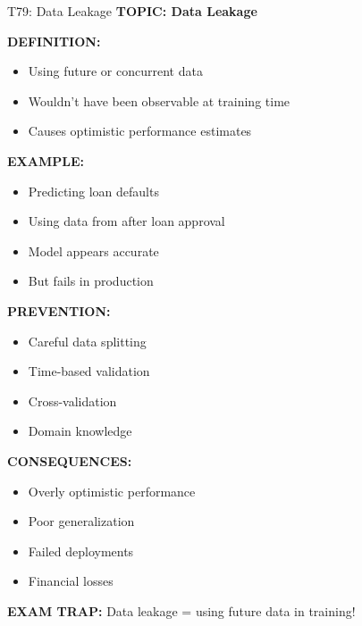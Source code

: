 \documentclass[8pt]{beamer}
\begin{document}
	\begin{frame}{T79: Data Leakage}
		\fontsize{6.5}{7.5}\selectfont
		\textbf{TOPIC: Data Leakage}
		
		\vspace{0.1cm}
		\textbf{DEFINITION:}
		\begin{itemize}
			\item Using future or concurrent data
			\item Wouldn't have been observable at training time
			\item Causes optimistic performance estimates
		\end{itemize}
		
		\vspace{0.1cm}
		\textbf{EXAMPLE:}
		\begin{itemize}
			\item Predicting loan defaults
			\item Using data from after loan approval
			\item Model appears accurate
			\item But fails in production
		\end{itemize}
		
		\vspace{0.1cm}
		\textbf{PREVENTION:}
		\begin{itemize}
			\item Careful data splitting
			\item Time-based validation
			\item Cross-validation
			\item Domain knowledge
		\end{itemize}
		
		\vspace{0.1cm}
		\textbf{CONSEQUENCES:}
		\begin{itemize}
			\item Overly optimistic performance
			\item Poor generalization
			\item Failed deployments
			\item Financial losses
		\end{itemize}
		
		\textcolor{myred}{\textbf{EXAM TRAP:}} Data leakage = \textcolor{myblue}{using future data in training}!
	\end{frame}
	
\end{document}
